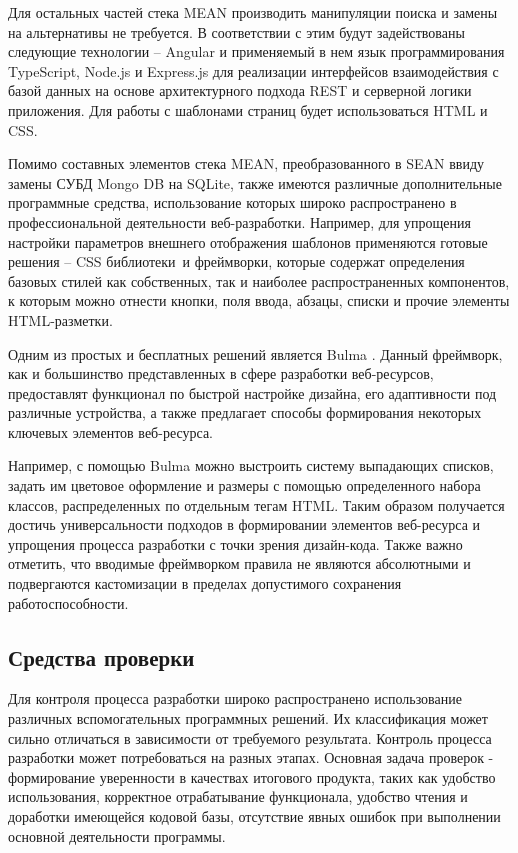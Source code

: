 Для остальных частей стека MEAN производить манипуляции поиска и замены на альтернативы не требуется.
В соответствии с этим будут задействованы следующие технологии -- Angular и применяемый в нем язык программирования TypeScript, Node.js и Express.js для реализации интерфейсов взаимодействия с базой данных на основе архитектурного подхода REST и серверной логики приложения.
Для работы с шаблонами страниц будет использоваться HTML и CSS.

Помимо составных элементов стека MEAN, преобразованного в SEAN ввиду замены СУБД Mongo DB на SQLite, также имеются различные дополнительные программные средства, использование которых широко распространено в профессиональной деятельности веб-разработки.
Например, для упрощения настройки параметров внешнего отображения шаблонов применяются готовые решения -- CSS библиотеки и фреймворки, которые содержат определения базовых стилей как собственных, так и наиболее распространенных компонентов, к которым можно отнести кнопки, поля ввода, абзацы, списки и прочие элементы HTML-разметки.

Одним из простых и бесплатных решений является Bulma \cite{bulma}.
Данный фреймворк, как и большинство представленных в сфере разработки веб-ресурсов, предоставлят функционал по быстрой настройке дизайна, его адаптивности под различные устройства, а также предлагает способы формирования некоторых ключевых элементов веб-ресурса.

Например, с помощью Bulma можно выстроить систему выпадающих списков, задать им цветовое оформление и размеры с помощью определенного набора классов, распределенных по отдельным тегам HTML.
Таким образом получается достичь универсальности подходов в формировании элементов веб-ресурса и упрощения процесса разработки с точки зрения дизайн-кода.
Также важно отметить, что вводимые фреймворком правила не являются абсолютными и подвергаются кастомизации в пределах допустимого сохранения работоспособности.

\subsection{Средства проверки}

Для контроля процесса разработки широко распространено использование различных вспомогательных программных решений.
Их классификация может сильно отличаться в зависимости от требуемого результата.
Контроль процесса разработки может потребоваться на разных этапах.
Основная задача проверок - формирование уверенности в качествах итогового продукта, таких как удобство использования, корректное отрабатывание функционала, удобство чтения и доработки имеющейся кодовой базы, отсутствие явных ошибок при выполнении основной деятельности программы.


